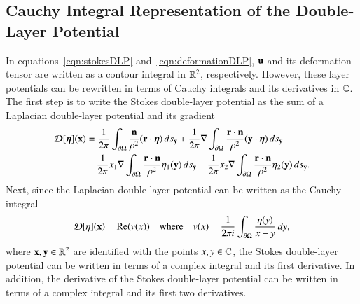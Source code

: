 \documentclass[preprint, 10pt]{elsarticle}
\begin{document}
\subsection{Cauchy Integral Representation of the Double-Layer
Potential}
\label{sec:DLPcomplex}
In equations~\eqref{eqn:stokesDLP} and~\eqref{eqn:deformationDLP}, ${\mathbf{u}}$
and its deformation tensor are written as a contour integral in ${\mathbb{R}}^2$,
respectively.  However, these layer potentials can be rewritten in terms
of Cauchy integrals and its derivatives in ${\mathbb{C}}$.  The first step is to
write the Stokes double-layer potential as the sum of a Laplacian
double-layer potential and its gradient
\begin{equation}
  \label{eqn:Stokes2Laplace}
  \begin{aligned}
    {\boldsymbol{\mathcal D}}[{\boldsymbol\eta}]({\mathbf{x}}) &= 
      \frac{1}{2\pi} \int_{{\partial}\Omega} 
        \frac{{\mathbf{n}}}{\rho^2} ({\mathbf{r}} \cdot {\boldsymbol\eta}) \, ds_{\mathbf{y}} + 
      \frac{1}{2\pi} \nabla \int_{{\partial}\Omega}
        \frac{{\mathbf{r}} \cdot {\mathbf{n}}}{\rho^2} ({\mathbf{y}} \cdot {\boldsymbol\eta}) \, ds_{\mathbf{y}} \\
      &- \frac{1}{2\pi} x_1 \nabla \int_{{\partial}\Omega}
        \frac{{\mathbf{r}} \cdot {\mathbf{n}}}{\rho^2}\eta_1({\mathbf{y}}) \, ds_{\mathbf{y}} -
      \frac{1}{2\pi} x_2 \nabla \int_{{\partial}\Omega}
        \frac{{\mathbf{r}} \cdot {\mathbf{n}}}{\rho^2}\eta_2({\mathbf{y}}) \, ds_{\mathbf{y}}.
  \end{aligned}
\end{equation}
Next, since the Laplacian double-layer potential can be written as the
Cauchy integral
\begin{align}
  {\mathcal{D}}[\eta]({\mathbf{x}}) = {\operatorname{Re}} (v(x)) \quad \text{where} \quad
  v(x) = \frac{1}{2\pi i} \int_{{\partial}\Omega}
    \frac{\eta(y)}{x - y} \, dy,
  \label{eqn:laplaceComplex}
\end{align}
where ${\mathbf{x}},{\mathbf{y}} \in {\mathbb{R}}^2$ are identified with the points $x,y \in {\mathbb{C}}$,
the Stokes double-layer potential can be written in terms of a complex
integral and its first derivative.  In addition, the derivative of the
Stokes double-layer potential can be written in terms of a complex
integral and its first two derivatives.
\end{document}
